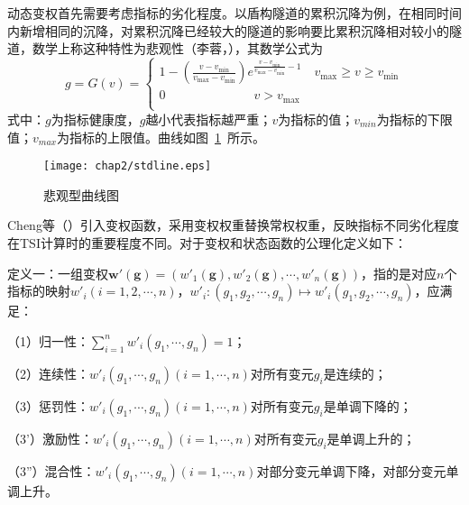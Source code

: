 动态变权首先需要考虑指标的劣化程度。以盾构隧道的累积沉降为例，在相同时间内新增相同的沉降，对累积沉降已经较大的隧道的影响要比累积沉降相对较小的隧道，数学上称这种特性为悲观性（李蓉，\citeyear{李蓉2007基于层次分析法的桥梁健康状态模糊综合评估方法的研究及其应用}），其数学公式为
\begin{equation}
    g=G(v)=\left\{ \begin{matrix}
   1-\left( \frac{v-{{v}_{\min }}}{{{v}_{\max }}-{{v}_{\min }}} \right){{e}^{\frac{v-{{v}_{\min }}}{{{v}_{\max }}-{{v}_{\min }}}-1}}\quad {{v}_{\max }}\ge v\ge {{v}_{\min }}  \\
   0\quad \quad \quad \quad \quad \quad \quad v>{{v}_{\max }}  \\
\end{matrix} \right.
\end{equation}
式中：$g$为指标健康度，$g$越小代表指标越严重；$v$为指标的值；$v_{min}$为指标的下限值；$v_{max}$为指标的上限值。曲线如图~\ref{fig:悲观型曲线图}~所示。

\begin{figure}[htb!]
    \centering
    \texttt{[image: chap2/stdline.eps]}
    \caption{悲观型曲线图}
    \label{fig:悲观型曲线图}
\end{figure}

Cheng等（\citeyear{cheng1999evaluating}）引入变权函数，采用变权权重替换常权权重，反映指标不同劣化程度在TSI计算时的重要程度不同。对于变权和状态函数的公理化定义如下：

定义一：一组变权$\mathbf{{w}'}(\mathbf{g})=\left( {{{{w}'}}_{1}}(\mathbf{g}),{{{{w}'}}_{2}}(\mathbf{g}),\cdots ,{{{{w}'}}_{n}}(\mathbf{g}) \right)$，指的是对应$n$个指标的映射${{{w}'}_{i}}(i=1,2,\cdots ,n)$，${{{w}'}_{i}}:({{g}_{1}},{{g}_{2}},\cdots ,{{g}_{n}})\mapsto {{{w}'}_{i}}({{g}_{1}},{{g}_{2}},\cdots ,{{g}_{n}})$，应满足：

（1）归一性：$\sum\limits_{i=1}^{n}{{{{{w}'}}_{i}}({{g}_{1}},\cdots ,{{g}_{n}})=1}$；

（2）连续性：${{{w}'}_{i}}({{g}_{1}},\cdots ,{{g}_{n}})(i=1,\cdots ,n)$对所有变元$g_i$是连续的；

（3）惩罚性：${{{w}'}_{i}}({{g}_{1}},\cdots ,{{g}_{n}})(i=1,\cdots ,n)$对所有变元$g_i$是单调下降的；

（3'）激励性：${{{w}'}_{i}}({{g}_{1}},\cdots ,{{g}_{n}})(i=1,\cdots ,n)$对所有变元$g_i$是单调上升的；

（3''）混合性：${{{w}'}_{i}}({{g}_{1}},\cdots ,{{g}_{n}})(i=1,\cdots ,n)$对部分变元单调下降，对部分变元单调上升。

